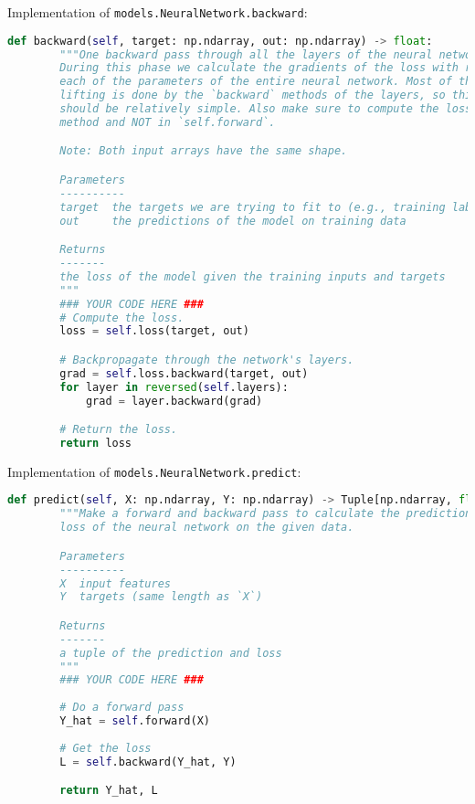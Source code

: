 Implementation of \texttt{models.NeuralNetwork.backward}:

\begin{lstlisting}[language=Python]
    def backward(self, target: np.ndarray, out: np.ndarray) -> float:
        """One backward pass through all the layers of the neural network.
        During this phase we calculate the gradients of the loss with respect to
        each of the parameters of the entire neural network. Most of the heavy
        lifting is done by the `backward` methods of the layers, so this method
        should be relatively simple. Also make sure to compute the loss in this
        method and NOT in `self.forward`.

        Note: Both input arrays have the same shape.

        Parameters
        ----------
        target  the targets we are trying to fit to (e.g., training labels)
        out     the predictions of the model on training data

        Returns
        -------
        the loss of the model given the training inputs and targets
        """
        ### YOUR CODE HERE ###
        # Compute the loss.
        loss = self.loss(target, out)

        # Backpropagate through the network's layers.
        grad = self.loss.backward(target, out)
        for layer in reversed(self.layers):
            grad = layer.backward(grad)

        # Return the loss.
        return loss

\end{lstlisting}

Implementation of \texttt{models.NeuralNetwork.predict}:

\begin{lstlisting}[language=Python]
    def predict(self, X: np.ndarray, Y: np.ndarray) -> Tuple[np.ndarray, float]:
        """Make a forward and backward pass to calculate the predictions and
        loss of the neural network on the given data.

        Parameters
        ----------
        X  input features
        Y  targets (same length as `X`)

        Returns
        -------
        a tuple of the prediction and loss
        """
        ### YOUR CODE HERE ###
        
        # Do a forward pass
        Y_hat = self.forward(X)
        
        # Get the loss
        L = self.backward(Y_hat, Y)

        return Y_hat, L

\end{lstlisting}

